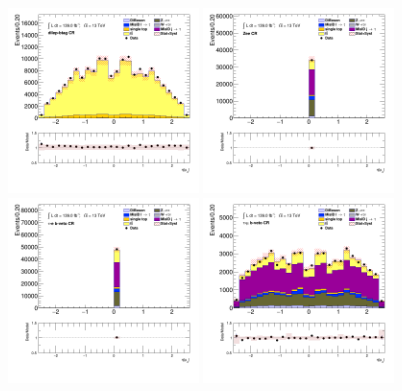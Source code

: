 		\begin{figure}[!htp]
			\begin{center}    
			\includegraphics[width=0.45\textwidth]{chapters/chapter6_HPlus/images/taulep/mu_0_eta_DILEP_BTAG.png}
			\includegraphics[width=0.45\textwidth]{chapters/chapter6_HPlus/images/taulep/mu_0_eta_ZEE.png} \\
			\includegraphics[width=0.45\textwidth]{chapters/chapter6_HPlus/images/taulep/mu_0_eta_TAUEL_BVETO.png} 
			\includegraphics[width=0.45\textwidth]{chapters/chapter6_HPlus/images/taulep/mu_0_eta_TAUMU_BVETO.png} \\

\end{center}
\end{figure}
